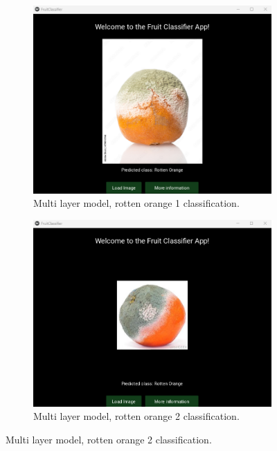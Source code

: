 \documentclass[conference]{IEEEtran}
\begin{document}
\begin{figure}[h]
    \hfill
    \begin{subfigure}[b]{0.48\linewidth}
        \centering
        \includegraphics[width=\linewidth]{Mlayer orageR1.png}
        \caption{Multi layer model, rotten orange 1 classification.}
        \label{figFA}
    \end{subfigure}
    \hfill
    \begin{subfigure}[b]{0.48\linewidth}
        \centering
        \includegraphics[width=\linewidth]{Mlayer orageR2.png}
        \caption{Multi layer model, rotten orange 2 classification.}
        \label{figFB}
    \end{subfigure}
    \hfill

\end{figure}
\end{document}

